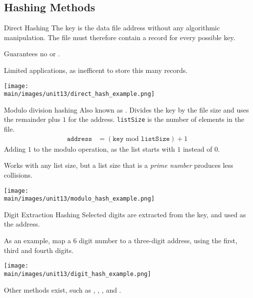 \documentclass[\main/notes.tex]{subfiles}
\begin{document}
			\subsection{Hashing Methods}
				\begin{definition}{Direct Hashing}
					The key is the data file address without any algorithmic manipulation. The file must therefore contain a record for every possible key.

					Guarantees no  or .

					Limited applications, as inefficent to store this many records.

					\begin{center}
						\texttt{[image: \\main/images/unit13/direct\_hash\_example.png]}
					\end{center}
				\end{definition}
				\pagebreak
				\begin{definition}{Modulo division hashing}
					Also known as . Divides the key by the file size and uses the remainder plus $1$ for the address. \texttt{listSize} is the number of elements in the file.
					\begin{align*}
						\mathtt{address} &= (\mathtt{key} \text{ mod } \mathtt{listSize}) + 1
					\end{align*}
					Adding $1$ to the modulo operation, as the list starts with $1$ instead of $0$.

					Works with any list size, but a list size that is a \emph{prime number} produces less collisions.

					\begin{center}
						\texttt{[image: \\main/images/unit13/modulo\_hash\_example.png]}
					\end{center}
				\end{definition}
				\begin{definition}{Digit Extraction Hashing}
					Selected digits are extracted from the key, and used as the address.

					As an example, map a $6$ digit number to a three-digit address, using the first, third and fourth digits.
					\begin{center}
						\texttt{[image: \\main/images/unit13/digit\_hash\_example.png]}
					\end{center}
				\end{definition}
				Other methods exist, such as , , , and .
			\pagebreak
\end{document}
